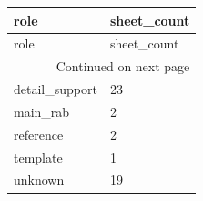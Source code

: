 \begingroup
\scriptsize
\begin{longtable}{ll}
\toprule
role & sheet_count \\
\midrule
\endfirsthead
\toprule
role & sheet_count \\
\midrule
\endhead
\midrule
\multicolumn{2}{r}{Continued on next page} \\
\midrule
\endfoot
\bottomrule
\endlastfoot
detail\_support & 23 \\
main\_rab & 2 \\
reference & 2 \\
template & 1 \\
unknown & 19 \\
\end{longtable}
\endgroup
